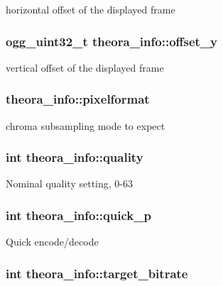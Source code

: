 horizontal offset of the displayed frame \hypertarget{structtheora__info_a91c3922097ba32a85acd584a01dc2c93}{
\subsubsection[{offset\+\_\+y}]{\setlength{\rightskip}{0pt plus 5cm}ogg\+\_\+uint32\+\_\+t theora\+\_\+info\+::offset\+\_\+y}}\label{structtheora__info_a91c3922097ba32a85acd584a01dc2c93}
vertical offset of the displayed frame \hypertarget{structtheora__info_a65ab4376ab5242ee82e06c78fb7008ab}{
\subsubsection[{pixelformat}]{ theora\+\_\+info\+::pixelformat}}\label{structtheora__info_a65ab4376ab5242ee82e06c78fb7008ab}
chroma subsampling mode to expect \hypertarget{structtheora__info_a71a4748a5f31bd58d0e403b7806c980d}{
\subsubsection[{quality}]{\setlength{\rightskip}{0pt plus 5cm}int theora\+\_\+info\+::quality}}\label{structtheora__info_a71a4748a5f31bd58d0e403b7806c980d}
Nominal quality setting, 0-\/63 \hypertarget{structtheora__info_a2dfae4fd175dbd19254eaf0697778ff5}{
\subsubsection[{quick\+\_\+p}]{\setlength{\rightskip}{0pt plus 5cm}int theora\+\_\+info\+::quick\+\_\+p}}\label{structtheora__info_a2dfae4fd175dbd19254eaf0697778ff5}
Quick encode/decode \hypertarget{structtheora__info_a0cfba041767ae2416dd190a406afe713}{
\subsubsection[{target\+\_\+bitrate}]{\setlength{\rightskip}{0pt plus 5cm}int theora\+\_\+info\+::target\+\_\+bitrate}}\label{structtheora__info_a0cfba041767ae2416dd190a406afe713}
